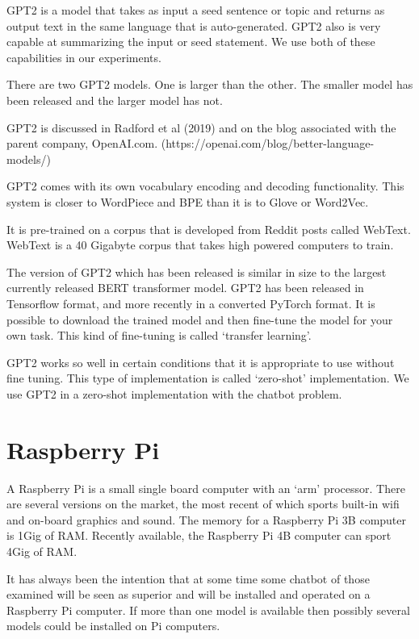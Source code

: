 GPT2 is a model that takes as input a seed sentence or topic and returns as output text in the same language that is auto-generated. GPT2 also is very capable at summarizing the input or seed statement. We use both of these capabilities in our experiments.

There are two GPT2 models. One is larger than the other. The smaller model has been released and the larger model has not. 

GPT2 is discussed in Radford et al (2019)\cite{radford2019language} and on the blog associated with the parent company, OpenAI.com. (https://openai.com/blog/better-language-models/)

GPT2 comes with its own vocabulary encoding and decoding functionality. This system is closer to
WordPiece and BPE than it is to Glove or Word2Vec.

It is pre-trained on a corpus that is developed from Reddit posts called WebText. WebText is a
40 Gigabyte corpus that takes high powered computers to train.

The version of GPT2 which has been released is similar in size to the largest currently released 
BERT transformer model. GPT2 has been released in Tensorflow format, and more recently in a converted PyTorch format. It is possible to download the trained model and then fine-tune the model for your own task. This kind of fine-tuning is called `transfer learning'. 

GPT2 works so well in certain conditions that it is appropriate to use without fine tuning. This 
type of implementation is called `zero-shot' implementation. We use GPT2 in a zero-shot implementation with the chatbot problem.


\iffalse
\section{Raspberry Pi}

A Raspberry Pi is a small single board computer with an `arm' processor. There are 
several versions on the market, the most recent of which sports built-in wifi and
on-board graphics and sound. The memory for a Raspberry Pi 3B computer is 1Gig of RAM. Recently
available, the Raspberry Pi 4B computer can sport 4Gig of RAM.

It has always been the intention that at some time some chatbot of
those examined will be seen as superior and will be installed and
operated on a Raspberry Pi computer. If more than one model is available
then possibly several models could be installed on Pi computers.

